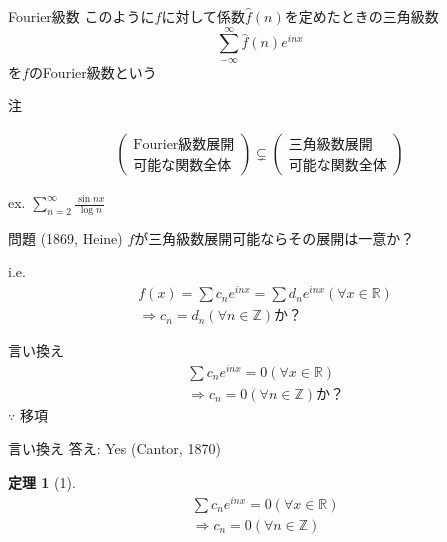 \documentclass[dvipdfmx,17pt]{beamer}
\theoremstyle{plain}
\newtheorem{thm}{定理}
\newcommand{\Z}{\mathbb{Z}}
\newcommand{\R}{\mathbb{R}}
\begin{document}
\begin{frame}{Fourier級数}
このように$f$に対して係数$\hat{f}(n)$を定めたときの三角級数
\[\sum_{-\infty}^{\infty} \hat{f}(n)e^{inx} \]
を$f$のFourier級数という
\end{frame}

\begin{frame}{注}

\begin{align*}
\left(\begin{matrix}
\text{Fourier級数展開} \\
\text{可能な関数全体}
\end{matrix}\right)
\subsetneq
\left(\begin{matrix}
\text{三角級数展開} \\
\text{可能な関数全体}
\end{matrix}\right)
\end{align*}

\vspace{1cm}
ex. $\sum_{n=2}^\infty \frac{\sin nx}{\log n}$
\end{frame}

\begin{frame}{問題 (1869, Heine)}
$f$が三角級数展開可能ならその展開は一意か？

i.e.
\begin{align*}
& f(x) = \sum c_n e^{inx} = \sum d_n e^{inx} (\forall x \in \R) \\
& \Rightarrow c_n = d_n (\forall n \in \Z) \text{か？}
\end{align*}
\end{frame}

\begin{frame}{言い換え}
\begin{align*}
& \sum c_n e^{inx} = 0 (\forall x \in \R) \\
& \Rightarrow c_n = 0 (\forall n \in \Z) \text{か？}
\end{align*}
$\because$ 移項
\end{frame}

\begin{frame}{言い換え}
答え: Yes (Cantor, 1870)
\begin{thm}[1]
\begin{align*}
& \sum c_n e^{inx} = 0 (\forall x \in \R) \\
& \Rightarrow c_n = 0 (\forall n \in \Z)
\end{align*}
\end{thm}
\end{frame}
\end{document}
